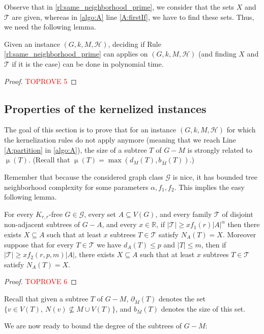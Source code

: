 \documentclass{amsart}
\newcommand{\RR}{\mathbb{R}}
\newcommand{\G}{\mathcal{G}}
\newcommand{\pom}{\partial_{\overline{M}}}
\newcommand{\bom}{b_{\overline{M}}}
\newcommand{\mT}{\mathcal{T}}
\newcommand{\mH}{\mathcal{H}}
\DeclareMathOperator\db{\mu}
\newcommand{\ruleref}[1]{\hyperref[#1]{\ref*{#1}}}
\begin{document}
Observe that in \ruleref{rl:same_neighborhood_prime}, we consider that the sets $X$ and $\mT$ are given, whereas in \autoref{algo:A} line \ref{A:firstIf}, we have to find these sets. Thus, we need the following lemma.

\begin{lemma}\label{lemma:KR4poly}
Given an instance $(G,k,M,\mH)$, deciding if Rule \ruleref{rl:same_neighborhood_prime} can applies on $(G,k,M,\mH)$ (and finding $X$ and $\mT$ if it is the case) can be done in polynomial time.
\end{lemma}
\begin{proof}\textcolor{red}{TOPROVE 5}\end{proof}

\subsection{Properties of the kernelized instances}\label{sec:propertiesKernelized}
The goal of this section is to prove that for an instance $(G,k,M,\mH)$ for which the kernelization rules do not apply anymore (meaning that we reach Line \ref{A:partition} in \autoref{algo:A}), the size of a subtree $T$ of $G-M$ is strongly related to $\db(T)$.  (Recall that $\db(T)=\max(d_M(T), \bom(T))$.)

Remember that because the considered graph class $\G$ is nice, it has bounded tree neighborhood complexity for some parameters $\alpha,f_1,f_2$. This implies the easy following lemma.
\begin{lemma}\label{cor:neightrivial}
For every $K_{r,r}$-free $G\in \G$, every set $A\subseteq V(G)$, and every family $\mT$ of disjoint non-adjacent subtrees of $G-A$, and every $x\in \RR$, if $|\mT|\geq xf_1(r)|A|^\alpha$ then there exists $X\subseteq A$ such that at least $x$ subtrees $T\in \mT$ satisfy $N_A(T)=X$. Moreover suppose that for every $T\in \mT$ we have $d_A(T)\leq p$ and $|T|\leq m$, then if $|\mT|\geq xf_2(r,p,m)|A|$, there exists $X\subseteq A$ such that at least $x$ subtrees $T\in \mT$ satisfy $N_A(T)=X$.
\end{lemma}
\begin{proof}\textcolor{red}{TOPROVE 6}\end{proof}


Recall that given a subtree $T$ of $G-M$, $\pom (T)$ denotes the set $\{v\in V(T),~N(v) \not\subseteq M\cup V(T) \}$, and $\bom (T)$ denotes the size of this set.

We are now ready to bound the degree of the subtrees of $G-M$:
\end{document}
